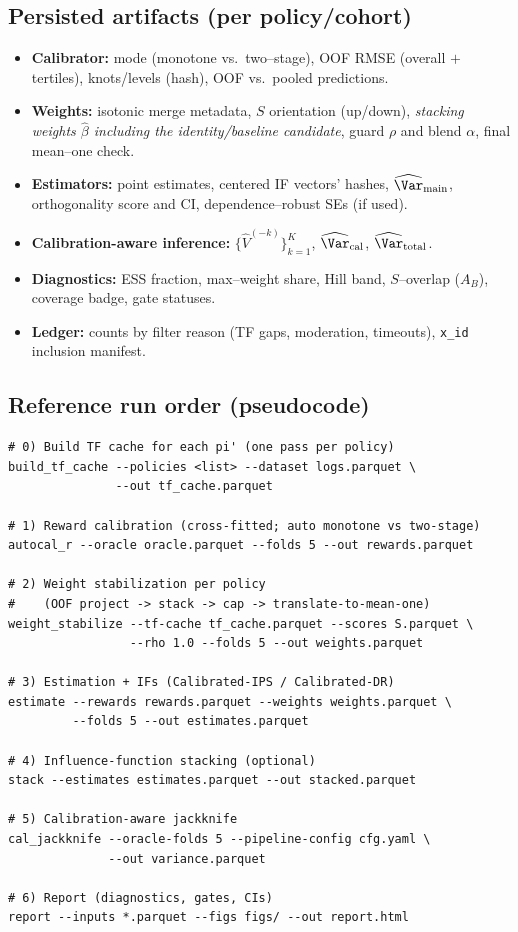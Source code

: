 \subsection{Persisted artifacts (per policy/cohort)}
\label{app:impl-artifacts}
\begin{itemize}[leftmargin=*,itemsep=2pt,topsep=2pt]
\item \textbf{Calibrator:} mode (monotone vs.\ two–stage), OOF RMSE (overall $+$ tertiles), knots/levels (hash), OOF vs.\ pooled predictions.
\item \textbf{Weights:} isotonic merge metadata, $S$ orientation (up/down), \emph{stacking weights $\hat\beta$ including the identity/baseline candidate}, guard $\rho$ and blend $\alpha$, final mean–one check.
\item \textbf{Estimators:} point estimates, centered IF vectors’ hashes, $\widehat{\Var}_{\mathrm{main}}$, orthogonality score and CI, dependence–robust SEs (if used).
\item \textbf{Calibration-aware inference:} $\{\widehat V^{(-k)}\}_{k=1}^K$, $\widehat{\Var}_{\mathrm{cal}}$, $\widehat{\Var}_{\mathrm{total}}$.
\item \textbf{Diagnostics:} ESS fraction, max–weight share, Hill band, $S$–overlap ($A_B$), coverage badge, gate statuses.
\item \textbf{Ledger:} counts by filter reason (TF gaps, moderation, timeouts), \texttt{x\_id} inclusion manifest.
\end{itemize}

\subsection{Reference run order (pseudocode)}
\label{app:impl-run}
\begin{verbatim}
# 0) Build TF cache for each pi' (one pass per policy)
build_tf_cache --policies <list> --dataset logs.parquet \
               --out tf_cache.parquet

# 1) Reward calibration (cross-fitted; auto monotone vs two-stage)
autocal_r --oracle oracle.parquet --folds 5 --out rewards.parquet

# 2) Weight stabilization per policy
#    (OOF project -> stack -> cap -> translate-to-mean-one)
weight_stabilize --tf-cache tf_cache.parquet --scores S.parquet \
                 --rho 1.0 --folds 5 --out weights.parquet

# 3) Estimation + IFs (Calibrated-IPS / Calibrated-DR)
estimate --rewards rewards.parquet --weights weights.parquet \
         --folds 5 --out estimates.parquet

# 4) Influence-function stacking (optional)
stack --estimates estimates.parquet --out stacked.parquet

# 5) Calibration-aware jackknife
cal_jackknife --oracle-folds 5 --pipeline-config cfg.yaml \
              --out variance.parquet

# 6) Report (diagnostics, gates, CIs)
report --inputs *.parquet --figs figs/ --out report.html
\end{verbatim}

